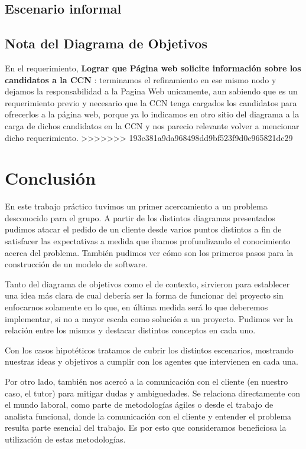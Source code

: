 \documentclass[spanish, 10pt,a4paper]{article}
\numberwithin{equation}{section} %
\begin{document}
\subsection{Escenario informal}


\subsection{Nota del Diagrama de Objetivos}

	En el requerimiento, \textbf{Lograr que Página web solicite información sobre los candidatos a la CCN} : terminamos el refinamiento en ese mismo nodo y dejamos la responsabilidad a la Pagina Web unicamente, aun sabiendo que es un requerimiento previo y necesario que la CCN tenga cargados los candidatos para ofrecerlos a la página web, porque ya lo indicamos en otro sitio del diagrama a la carga de dichos candidatos en la CCN y nos parecio relevante volver a mencionar dicho requerimiento.
>>>>>>> 193c381a9da968498dd9bf523f9d0c965821dc29

\newpage
\section{Conclusión}
	En este trabajo práctico tuvimos un primer acercamiento a un problema desconocido para el grupo. A partir de los distintos diagramas presentados pudimos atacar el pedido de un cliente desde varios puntos distintos a fin de satisfacer las expectativas a medida que ibamos profundizando el conocimiento acerca del problema. También pudimos ver cómo son los primeros pasos para la construcción de un modelo de software.
	
	Tanto del diagrama de objetivos como el de contexto, sirvieron para establecer una idea más clara de cual debería ser la forma de funcionar del proyecto sin enfocarnos solamente en lo que, en última medida será lo que deberemos implementar, si no a mayor escala como solución a un proyecto. Pudimos ver la relación entre los mismos y destacar distintos conceptos en cada uno.

	Con los casos hipotéticos tratamos de cubrir los distintos escenarios, mostrando nuestras ideas y objetivos a cumplir con los agentes que intervienen en cada una.
	
	Por otro lado, también nos acercó a la comunicación con el cliente (en nuestro caso, el tutor) para mitigar dudas y ambiguedades. Se relaciona directamente con el mundo laboral, como parte de metodologías ágiles o desde el trabajo de analista funcional, donde la comunicación con el cliente y entender el problema resulta parte esencial del trabajo. Es por esto que consideramos beneficiosa la utilización de estas metodologías.

\end{document}
